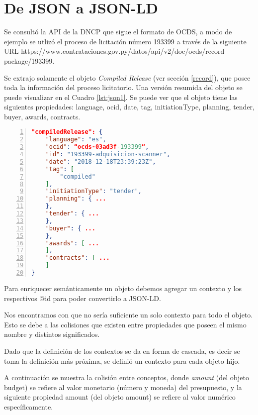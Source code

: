 \section{De JSON a JSON-LD}


Se consultó la API de la DNCP que sigue el formato de OCDS, a modo de ejemplo se utlizó el proceso de licitación número 193399 a través de la siguiente URL https://www.contrataciones.gov.py/datos/api/v2/doc/ocds/record-package/193399.

Se extrajo solamente el objeto \textit{Compiled Release} (ver sección \ref{record}), que posee toda la información del proceso licitatorio. Una versión resumida del objeto se puede visualizar en el Cuadro \ref{lst:json1}. Se puede ver que el objeto tiene las siguientes propiedades: language, ocid, date, tag, initiationType, planning, tender, buyer, awards, contracts.\hfill \break

\noindent\begin{minipage}{\textwidth}
\begin{lstlisting}[captionpos=b, caption=Objeto JSON del OCDS de un Compiled Release, label=lst:json1,  numbers=left, language=json, numberstyle=\tiny\color{mygray},frame=single]
"compiledRelease": {
    "language": "es",
    "ocid": “ocds-03ad3f-193399“,
    "id": "193399-adquisicion-scanner",
    "date": "2018-12-18T23:39:23Z",
    "tag": [
        "compiled"
    ],
    "initiationType": "tender",
    "planning": { ...
    },
    "tender": { ...
    },
    "buyer": { ...
    },
    "awards": [ ...
    ],
    "contracts": [ ...
    ]
}
\end{lstlisting}
\end{minipage}


Para enriquecer semánticamente un objeto debemos agregar un contexto y los respectivos @id para poder convertirlo a JSON-LD. 

Nos encontramos con que no sería suficiente un solo contexto para todo el objeto. Esto se debe a las colisiones que existen entre propiedades que poseen el mismo nombre y distintos significados.

Dado que la definición de los contextos se da en forma de cascada, es decir se toma la definición más próxima, se definió un contexto para cada objeto hijo.

A continuación se muestra la colisión entre conceptos, donde \textit{amount} (del objeto budget) se refiere al valor monetario (número y moneda) del presupuesto, y la siguiente propiedad amount (del objeto amount) se refiere al valor numérico específicamente.\hfill \break

